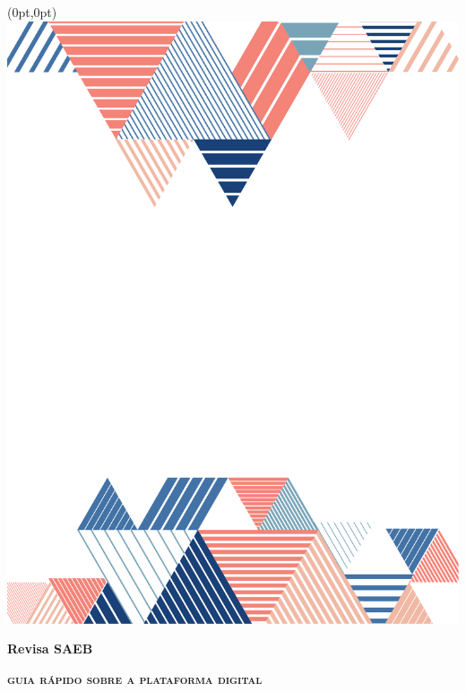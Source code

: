 
\begingroup\thispagestyle{empty}

\begin{textblock*}{2.625in}(0pt,0pt)%
\vspace*{-3.5cm}
\hspace*{-4cm}\includegraphics[scale=1]{../watermarks/front9ano.pdf}
\end{textblock*}
                
              \vspace*{\fill}
              \begin{center}
              {\HUGE\textbf{Revisa SAEB}}\bigskip

              {\LARGE\textbf{\textsc{guia rápido sobre a plataforma digital}}}

              \bigskip
              \bigskip
              \bigskip

              \end{center}
              \vspace*{\fill}

\endgroup
\pagebreak